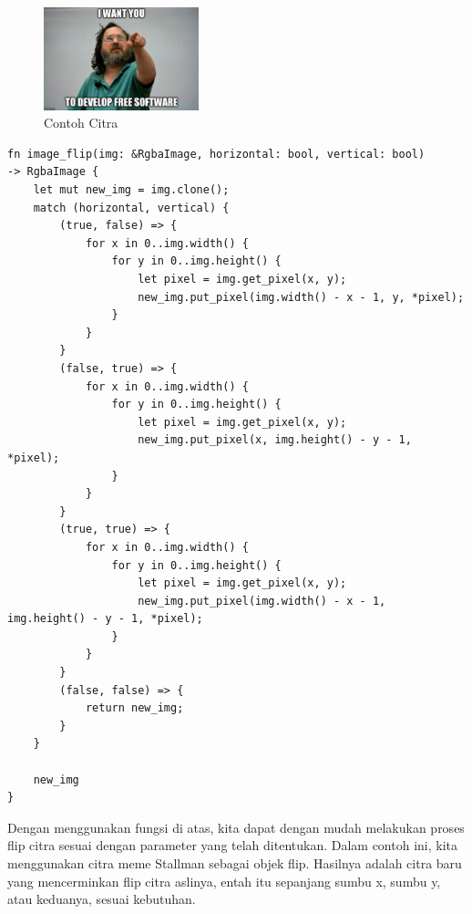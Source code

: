 \documentclass[a4paper,12pt,openany]{book}
\begin{document}
\begin{figure}[H]
    \centering
    \includegraphics[width=0.4\textwidth]{./image/geometry/stallman-meme.jpg}
    \caption{Contoh Citra}
\end{figure}

\begin{lstlisting}
fn image_flip(img: &RgbaImage, horizontal: bool, vertical: bool)
-> RgbaImage {
    let mut new_img = img.clone();
    match (horizontal, vertical) {
        (true, false) => {
            for x in 0..img.width() {
                for y in 0..img.height() {
                    let pixel = img.get_pixel(x, y);
                    new_img.put_pixel(img.width() - x - 1, y, *pixel);
                }
            }
        }
        (false, true) => {
            for x in 0..img.width() {
                for y in 0..img.height() {
                    let pixel = img.get_pixel(x, y);
                    new_img.put_pixel(x, img.height() - y - 1, *pixel);
                }
            }
        }
        (true, true) => {
            for x in 0..img.width() {
                for y in 0..img.height() {
                    let pixel = img.get_pixel(x, y);
                    new_img.put_pixel(img.width() - x - 1, img.height() - y - 1, *pixel);
                }
            }
        }
        (false, false) => {
            return new_img;
        }
    }

    new_img
}
\end{lstlisting}

Dengan menggunakan fungsi di atas, kita dapat dengan mudah melakukan proses flip citra sesuai dengan parameter yang telah ditentukan. Dalam contoh ini, kita menggunakan citra meme Stallman sebagai objek flip. Hasilnya adalah citra baru yang mencerminkan flip citra aslinya, entah itu sepanjang sumbu x, sumbu y, atau keduanya, sesuai kebutuhan.
\end{document}

